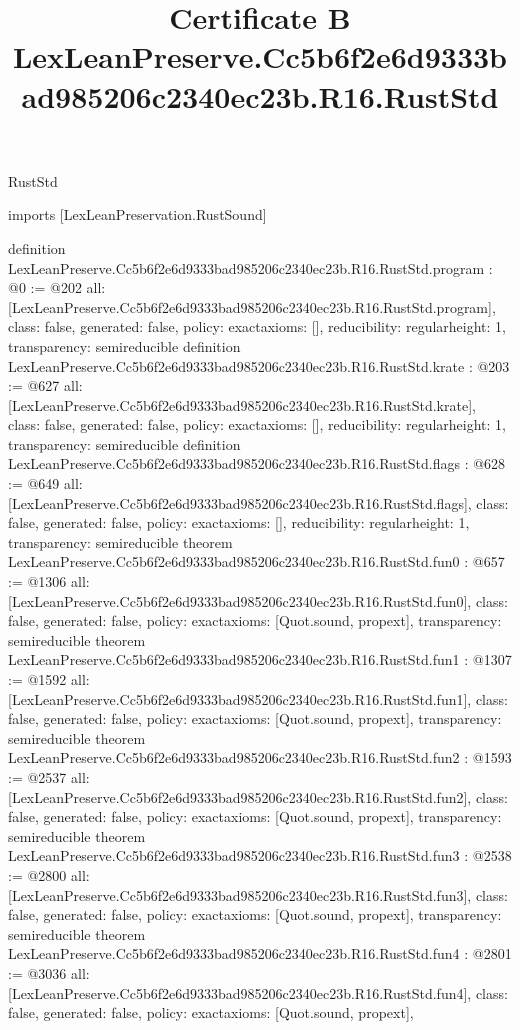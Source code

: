 \begin{lexlean}{RustStd}
\title{Certificate B LexLeanPreserve.Cc5b6f2e6d9333bad985206c2340ec23b.R16.RustStd}
\begin{coremodule}
imports [LexLeanPreservation.RustSound]

definition LexLeanPreserve.Cc5b6f2e6d9333bad985206c2340ec23b.R16.RustStd.program : @0 := @202 {
  all: [LexLeanPreserve.Cc5b6f2e6d9333bad985206c2340ec23b.R16.RustStd.program],
  class: false,
  generated: false,
  policy: exact{axioms: []},
  reducibility: regular{height: 1},
  transparency: semireducible
}
definition LexLeanPreserve.Cc5b6f2e6d9333bad985206c2340ec23b.R16.RustStd.krate : @203 := @627 {
  all: [LexLeanPreserve.Cc5b6f2e6d9333bad985206c2340ec23b.R16.RustStd.krate],
  class: false,
  generated: false,
  policy: exact{axioms: []},
  reducibility: regular{height: 1},
  transparency: semireducible
}
definition LexLeanPreserve.Cc5b6f2e6d9333bad985206c2340ec23b.R16.RustStd.flags : @628 := @649 {
  all: [LexLeanPreserve.Cc5b6f2e6d9333bad985206c2340ec23b.R16.RustStd.flags],
  class: false,
  generated: false,
  policy: exact{axioms: []},
  reducibility: regular{height: 1},
  transparency: semireducible
}
theorem LexLeanPreserve.Cc5b6f2e6d9333bad985206c2340ec23b.R16.RustStd.fun0 : @657 := @1306 {
  all: [LexLeanPreserve.Cc5b6f2e6d9333bad985206c2340ec23b.R16.RustStd.fun0],
  class: false,
  generated: false,
  policy: exact{axioms: [Quot.sound, propext]},
  transparency: semireducible
}
theorem LexLeanPreserve.Cc5b6f2e6d9333bad985206c2340ec23b.R16.RustStd.fun1 : @1307 := @1592 {
  all: [LexLeanPreserve.Cc5b6f2e6d9333bad985206c2340ec23b.R16.RustStd.fun1],
  class: false,
  generated: false,
  policy: exact{axioms: [Quot.sound, propext]},
  transparency: semireducible
}
theorem LexLeanPreserve.Cc5b6f2e6d9333bad985206c2340ec23b.R16.RustStd.fun2 : @1593 := @2537 {
  all: [LexLeanPreserve.Cc5b6f2e6d9333bad985206c2340ec23b.R16.RustStd.fun2],
  class: false,
  generated: false,
  policy: exact{axioms: [Quot.sound, propext]},
  transparency: semireducible
}
theorem LexLeanPreserve.Cc5b6f2e6d9333bad985206c2340ec23b.R16.RustStd.fun3 : @2538 := @2800 {
  all: [LexLeanPreserve.Cc5b6f2e6d9333bad985206c2340ec23b.R16.RustStd.fun3],
  class: false,
  generated: false,
  policy: exact{axioms: [Quot.sound, propext]},
  transparency: semireducible
}
theorem LexLeanPreserve.Cc5b6f2e6d9333bad985206c2340ec23b.R16.RustStd.fun4 : @2801 := @3036 {
  all: [LexLeanPreserve.Cc5b6f2e6d9333bad985206c2340ec23b.R16.RustStd.fun4],
  class: false,
  generated: false,
  policy: exact{axioms: [Quot.sound, propext]},
}
\end{coremodule}
\end{lexlean}
